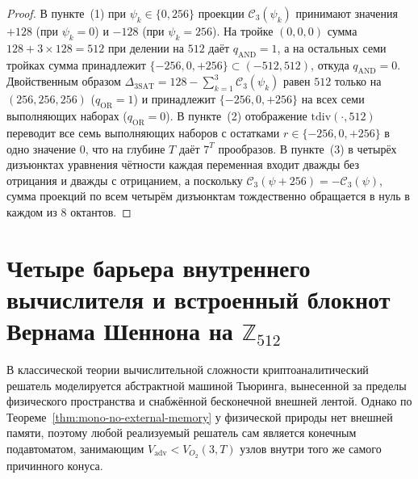 \begin{proof}
В пункте~(1) при $\psi_k \in \{0, 256\}$ проекции $\mathcal{C}_3(\psi_k)$ принимают значения $+128$ (при $\psi_k = 0$) и $-128$ (при $\psi_k = 256$). На тройке $(0,0,0)$ сумма $128 + 3\times 128 = 512$ при делении на $512$ даёт $q_{\mathrm{AND}} = 1$, а на остальных семи тройках сумма принадлежит $\{-256, 0, +256\} \subset (-512, 512)$, откуда $q_{\mathrm{AND}} = 0$. Двойственным образом $\Delta_{\mathrm{3SAT}} = 128 - \sum_{k=1}^3 \mathcal{C}_3(\psi_k)$ равен $512$ только на $(256,256,256)$ ($q_{\mathrm{OR}} = 1$) и принадлежит $\{-256, 0, +256\}$ на всех семи выполняющих наборах ($q_{\mathrm{OR}} = 0$). В пункте~(2) отображение $\mathrm{tdiv}(\cdot, 512)$ переводит все семь выполняющих наборов с остатками $r \in \{-256, 0, +256\}$ в одно значение $0$, что на глубине $T$ даёт $7^T$ прообразов. В пункте~(3) в четырёх дизъюнктах уравнения чётности каждая переменная входит дважды без отрицания и дважды с отрицанием, а поскольку $\mathcal{C}_3(\psi + 256) = -\mathcal{C}_3(\psi)$, сумма проекций по всем четырём дизъюнктам тождественно обращается в нуль в каждом из $8$ октантов.
\end{proof}

\section{Четыре барьера внутреннего вычислителя и встроенный блокнот Вернама Шеннона на \texorpdfstring{$\mathbb{Z}_{512}$}{Z512}}

В классической теории вычислительной сложности криптоаналитический решатель моделируется абстрактной машиной Тьюринга, вынесенной за пределы физического пространства и снабжённой бесконечной внешней лентой. Однако по Теореме~\ref{thm:mono-no-external-memory} у физической природы нет внешней памяти, поэтому любой реализуемый решатель сам является конечным подавтоматом, занимающим $V_{\mathrm{adv}} < V_{O_2}(3, T)$ узлов внутри того же самого причинного конуса.

